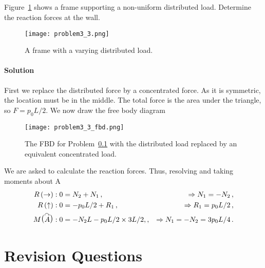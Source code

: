 \documentclass[a4paper,justified,oneside]{tufte-handout}
\numberwithin{equation}{subsection}
\begin{document}
\subsection{}\label{A4:sec:DistLoadFrame}
Figure~\ref{A4:fig:Q3a} shows a frame supporting a non-uniform distributed load. Determine the reaction forces at the wall.
\begin{figure}
	\centering
	\texttt{[image: problem3\_3.png]}
	\caption{A frame with a varying distributed load.}
	\label{A4:fig:Q3a}
\end{figure}

\begin{solution}
\paragraph{Solution}
First we replace the distributed force by a concentrated force. As it is symmetric, the location must be in the middle. The total force is the area under the triangle, so $F=p_0 L/2$.
We now draw the free body diagram
\begin{figure}
	\centering
	\texttt{[image: problem3\_3\_fbd.png]}
	\caption{The FBD for Problem~\protect\ref{A4:sec:DistLoadFrame} with the distributed load replaced by an equivalent concentrated load.}
	\label{A4:fig:Q3b}
\end{figure}

We are asked to calculate the reaction forces. Thus, resolving and taking moments about A
\begin{align*}
	R\left(\rightarrow\right)														: 0	&=N_2 + N_1\,,				&\Rightarrow N_1 = - N_2\,,\\
	R\left(\uparrow\right)															: 0	&= - p_0 L/2 + R_1\,,			&\Rightarrow R_1 = p_0 L/2\,,\\
	M\raisebox{1.5pt}{\big(}\overset{\curvearrowright}{A}\raisebox{1.5pt}{\big)}	: 0	&=-N_2 L -p_0 L/2 \times 3L/2,,					&\Rightarrow N_1 = - N_2 = 3p_0 L/4\,.	\\
\end{align*}
\end{solution}

\clearpage
\section{Revision Questions}
\end{document}

